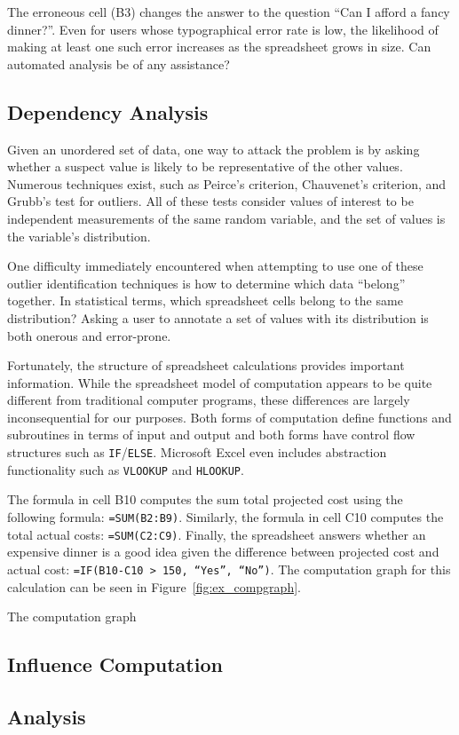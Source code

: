 The erroneous cell (B3) changes the answer to the question ``Can I afford a fancy dinner?''.  Even for users whose typographical error rate is low, the likelihood of making at least one such error increases as the spreadsheet grows in size.  Can automated analysis be of any assistance?

\subsection{Dependency Analysis}

Given an unordered set of data, one way to attack the problem is by asking whether a suspect value is likely to be representative of the other values.  Numerous techniques exist, such as Peirce's criterion, Chauvenet's criterion, and Grubb's test for outliers.  All of these tests consider values of interest to be independent measurements of the same random variable, and the set of values is the variable's distribution.

One difficulty immediately encountered when attempting to use one of these outlier identification techniques is how to determine which data ``belong'' together.  In statistical terms, which spreadsheet cells belong to the same distribution?  Asking a user to annotate a set of values with its distribution is both onerous and error-prone.

Fortunately, the structure of spreadsheet calculations provides important information.  While the spreadsheet model of computation appears to be quite different from traditional computer programs, these differences are largely inconsequential for our purposes.  Both forms of computation define functions and subroutines in terms of input and output and both forms have control flow structures such as \texttt{IF}/\texttt{ELSE}.  Microsoft Excel even includes abstraction functionality such as \texttt{VLOOKUP} and \texttt{HLOOKUP}.

The formula in cell B10 computes the sum total projected cost using the following formula: \texttt{=SUM(B2:B9)}.  Similarly, the formula in cell C10 computes the total actual costs: \texttt{=SUM(C2:C9)}.  Finally, the spreadsheet answers whether an expensive dinner is a good idea given the difference between projected cost and actual cost: \texttt{=IF(B10-C10 > 150, ``Yes'', ``No'')}.  The computation graph for this calculation can be seen in Figure~\ref{fig:ex_compgraph}.

The computation graph 

\subsection{Influence Computation}

\subsection{Analysis}